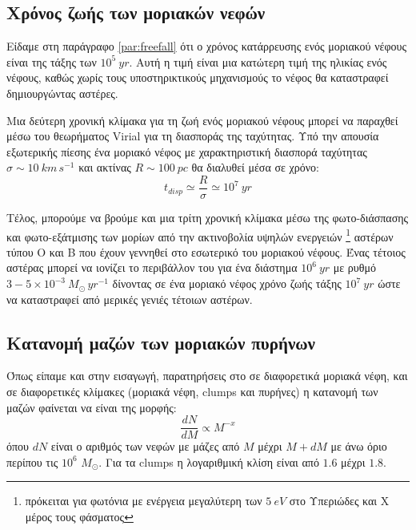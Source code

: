 \documentclass[a4paper,12pt]{memoir}
\newcommand{\sm}{$M_{\odot}$}
\begin{document}
 
 

\subsection{Χρόνος ζωής των μοριακών νεφών}
Είδαμε στη παράγραφο \ref{par:freefall} ότι ο χρόνος κατάρρευσης ενός μοριακού νέφους είναι της τάξης των $10^5 \ yr$. Αυτή η τιμή είναι μια κατώτερη τιμή της ηλικίας ενός νέφους, καθώς χωρίς τους υποστηρικτικούς μηχανισμούς το νέφος θα καταστραφεί δημιουργώντας αστέρες.

Μια δεύτερη χρονική κλίμακα για τη ζωή ενός μοριακού νέφους μπορεί να παραχθεί μέσω του θεωρήματος Virial για τη διασποράς της ταχύτητας. Υπό την απουσία εξωτερικής πίεσης ένα μοριακό νέφος με χαρακτηριστική διασπορά ταχύτητας $\sigma \sim 10 \ km \, s^{-1}$ και ακτίνας $R \sim 100 \ pc$ θα διαλυθεί μέσα σε χρόνο:
\begin{equation}
t_{disp} \simeq \frac{R}{\sigma} \simeq 10^7 \ yr
\end{equation} 

Τέλος, μπορούμε να βρούμε και μια τρίτη χρονική κλίμακα μέσω της φωτο-διάσπασης και φωτο-εξάτμισης των μορίων από την ακτινοβολία υψηλών ενεργειών \footnote{πρόκειται για φωτόνια με ενέργεια μεγαλύτερη των $5 \ eV$ στο Υπεριώδες και X μέρος τους φάσματος} αστέρων τύπου O και B που έχουν γεννηθεί στο εσωτερικό του μοριακού νέφους. Ένας τέτοιος αστέρας μπορεί να ιονίζει το περιβάλλον του για ένα διάστημα $10^6 \ yr$ με ρυθμό $3-5 \times 10^{-3} \ M_{\odot} \, yr^{-1}$ δίνοντας σε ένα μοριακό νέφος χρόνο ζωής τάξης $10^7 \ yr$ ώστε να καταστραφεί από μερικές γενιές τέτοιων αστέρων.



\subsection{Κατανομή μαζών των μοριακών πυρήνων} 
Όπως είπαμε και στην εισαγωγή, παρατηρήσεις στο  σε διαφορετικά μοριακά νέφη, και σε διαφορετικές κλίμακες (μοριακά νέφη, clumps και πυρήνες) η κατανομή των μαζών φαίνεται να είναι της μορφής:
\begin{equation}
\frac{dN}{dM} \propto M^{-x}
\end{equation}
όπου $dN$ είναι ο αριθμός των νεφών με μάζες από $M$ μέχρι $M+dM$ με άνω όριο περίπου τις $10^6$ \sm. Για τα clumps η λογαριθμική κλίση είναι από $1.6$ μέχρι $1.8$.
\end{document}
